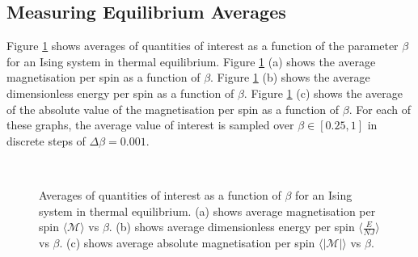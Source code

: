 \documentclass[11pt]{iopart}
\begin{document}
\subsection{Measuring Equilibrium Averages}

Figure \ref{fig:equilibriumaverages} shows averages of quantities of interest as a function of the parameter $\beta$ for an Ising system in thermal equilibrium. Figure \ref{fig:equilibriumaverages} (a) shows the average magnetisation per spin as a function of $\beta$. Figure \ref{fig:equilibriumaverages} (b) shows the average dimensionless energy per spin as a function of $\beta$. Figure \ref{fig:equilibriumaverages} (c) shows the average of the absolute value of the magnetisation per spin as a function of $\beta$. For each of these graphs, the average value of interest is sampled over $\beta \in [0.25, 1]$ in discrete steps of $\Delta \beta = 0.001$.

\begin{figure}[t]
    \centering
    \quad
     \
 
    \caption{Averages of quantities of interest as a function of $\beta$ for an Ising system in thermal equilibrium. (a) shows average magnetisation per spin $\langle\mathcal{M}\rangle$ vs $\beta$. (b) shows average dimensionless energy per spin $\langle\frac{E}{NJ}\rangle$ vs $\beta$. (c) shows average absolute magnetisation per spin $\langle|\mathcal{M}|\rangle$ vs $\beta$.}
    \label{fig:equilibriumaverages}
\end{figure}
\end{document}
